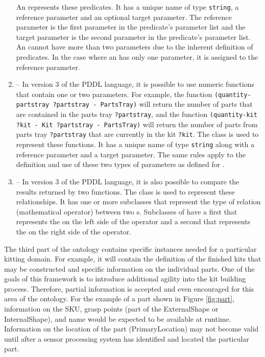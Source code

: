 \begin{enumerate}
An  represents these predicates. It has a unique name of type \texttt{string}, a reference parameter and an optional target parameter. The reference parameter is the first parameter in the predicate's parameter list and the target parameter is the second parameter in the predicate's parameter list. An  cannot have more than two parameters due to the inherent definition of predicates. In the case where an  has only one parameter, it is assigned to the reference parameter. 
%
\item {} -- In version 3 of the PDDL language, it is possible to use numeric functions that contain one or two parameters. For example, the function \texttt{(quantity-partstray ?partstray - PartsTray)} will return the number of parts that are contained in the parts tray \texttt{?partstray}, and the function
\texttt{(quantity-kit ?kit - Kit ?partstray - PartsTray)} will return the number of parts from parts tray \texttt{?partstray} that are currently in the kit \texttt{?kit}. The class  is used to represent these functions. It has a unique name  of type \texttt{string} along with a reference parameter and a target parameter. The same rules apply to the definition and use of these two types of parameters as defined for .
%
\item {} -- In version 3 of the PDDL language, it is also possible to compare the results returned by two functions. The class  is used to represent these relationships. It has one or more subclasses that represent the type of relation (mathematical operator) between two s. Subclasses of  have a first  that represents the  on the left side of the operator and a second  that represents the  on the right side of the operator.
\end{enumerate}

The third part of the ontology contains specific instances needed for a particular kitting domain. For example, it will contain the definition of the finished kits that may be
constructed and specific information on the individual parts. One of the goals of this framework is to introduce additional agility into the kit building process. Therefore,
partial information is accepted and even encouraged for this area of the ontology. For the example of a part shown in Figure \ref{fig:part}, information on the SKU, grasp points 
(part of the ExternalShape or InternalShape), and name would be expected to be available at runtime. Information on the location of the part (PrimaryLocation) may not
become valid until after a sensor processing system has identified and located the particular part.
%
